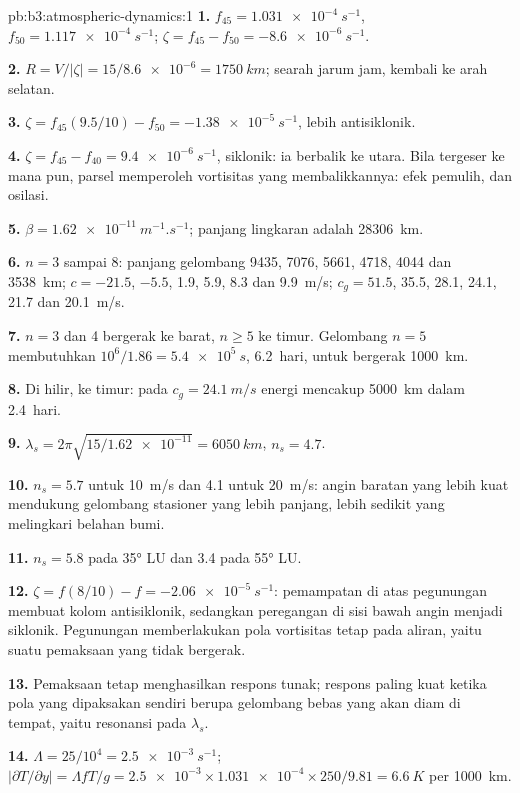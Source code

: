 \begin{solution}{pb:b3:atmospheric-dynamics:1}
\textbf{1.} $f_{45} = \qty{1.031e-4}{s^{-1}}$, $f_{50} =
\qty{1.117e-4}{s^{-1}}$; $\zeta = f_{45} - f_{50} = \qty{-8.6e-6}{s^{-1}}$.

\textbf{2.} $R = V/|\zeta| = 15/\num{8.6e-6} = \qty{1750}{km}$; searah jarum jam,
kembali ke arah selatan.

\textbf{3.} $\zeta = f_{45}(9.5/10) - f_{50} = \qty{-1.38e-5}{s^{-1}}$, lebih
antisiklonik.

\textbf{4.} $\zeta = f_{45} - f_{40} = \qty{+9.4e-6}{s^{-1}}$, siklonik: ia
berbalik ke utara. Bila tergeser ke mana pun, parsel memperoleh vortisitas
yang membalikkannya: efek pemulih, dan osilasi.

\textbf{5.} $\beta = \qty{1.62e-11}{m^{-1}.s^{-1}}$; panjang lingkaran adalah
\qty{28306}{km}.

\textbf{6.} $n = 3$ sampai 8: panjang gelombang 9435, 7076, 5661, 4718, 4044 dan
\qty{3538}{km}; $c = -21.5$, $-5.5$, 1.9, 5.9, 8.3 dan \qty{9.9}{m/s}; $c_g
= 51.5$, 35.5, 28.1, 24.1, 21.7 dan \qty{20.1}{m/s}.

\textbf{7.} $n = 3$ dan 4 bergerak ke barat, $n \ge 5$ ke timur. Gelombang $n = 5$ membutuhkan
$10^6/1.86 = \qty{5.4e5}{s}$, \num{6.2}~hari, untuk bergerak \qty{1000}{km}.

\textbf{8.} Di hilir, ke timur: pada $c_g = \qty{24.1}{m/s}$ energi mencakup
\qty{5000}{km} dalam \num{2.4}~hari.

\textbf{9.} $\lambda_s = 2\pi\sqrt{15/\num{1.62e-11}} = \qty{6050}{km}$,
$n_s = 4.7$.

\textbf{10.} $n_s = 5.7$ untuk \qty{10}{m/s} dan 4.1 untuk \qty{20}{m/s}: angin
baratan yang lebih kuat mendukung gelombang stasioner yang lebih panjang,
lebih sedikit yang melingkari belahan bumi.

\textbf{11.} $n_s = 5.8$ pada \ang{35} LU dan 3.4 pada \ang{55} LU.

\textbf{12.} $\zeta = f(8/10) - f = \qty{-2.06e-5}{s^{-1}}$: pemampatan di atas
pegunungan membuat kolom antisiklonik, sedangkan peregangan di sisi bawah angin
menjadi siklonik. Pegunungan memberlakukan pola vortisitas tetap pada aliran,
yaitu suatu pemaksaan yang tidak bergerak.

\textbf{13.} Pemaksaan tetap menghasilkan respons tunak; respons
paling kuat ketika pola yang dipaksakan sendiri berupa gelombang bebas yang
akan diam di tempat, yaitu resonansi pada $\lambda_s$.

\textbf{14.} $\Lambda = 25/10^4 = \qty{2.5e-3}{s^{-1}}$;
$|\partial T/\partial y| = \Lambda fT/g = \num{2.5e-3}\times\num{1.031e-4}
\times250/9.81 = \qty{6.6}{K}$ per \qty{1000}{km}.


\end{solution}
